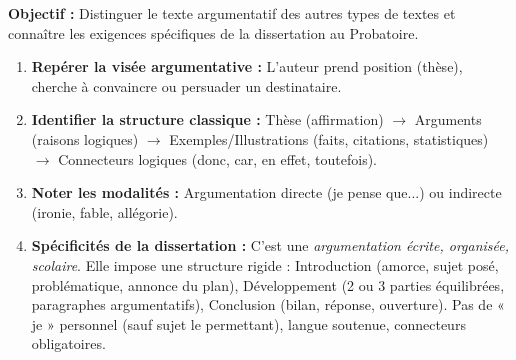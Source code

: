 \documentclass[11pt]{article}
\newcommand{\cle}[1]{{\popxbold\color{popdark}#1}}
\begin{document}
\begin{methode}
\textbf{Objectif :} Distinguer le texte argumentatif des autres types de textes et connaître les exigences spécifiques de la dissertation au Probatoire.
\begin{enumerate}
    \item \textbf{Repérer la visée argumentative :} L'auteur prend position (thèse), cherche à convaincre ou persuader un destinataire.
    \item \textbf{Identifier la structure classique :} Thèse (affirmation) $\rightarrow$ Arguments (raisons logiques) $\rightarrow$ Exemples/Illustrations (faits, citations, statistiques) $\rightarrow$ Connecteurs logiques (donc, car, en effet, toutefois).
    \item \textbf{Noter les modalités :} \cle{Argumentation directe} (je pense que...) ou \cle{indirecte} (ironie, fable, allégorie).
    \item \textbf{Spécificités de la dissertation :} C'est une \emph{argumentation écrite, organisée, scolaire}. Elle impose une structure rigide : \cle{Introduction} (amorce, sujet posé, problématique, annonce du plan), \cle{Développement} (2 ou 3 parties équilibrées, paragraphes argumentatifs), \cle{Conclusion} (bilan, réponse, ouverture). Pas de « je » personnel (sauf sujet le permettant), langue soutenue, connecteurs obligatoires.
\end{enumerate}
\end{methode}
\end{document}
